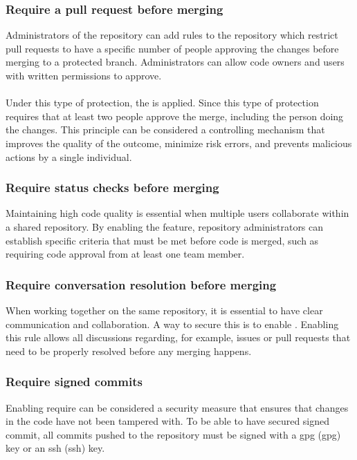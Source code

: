 \subsubsection{Require a pull request before merging}
Administrators of the repository can add rules to the repository which restrict pull requests to have a specific number of people approving the changes before merging to a protected branch. Administrators can allow code owners and users with written permissions to approve.
\\~\\
Under this type of protection, the  is applied. Since this type of protection requires that at least two people approve the merge, including the person doing the changes. This principle can be considered a controlling mechanism that improves the quality of the outcome, minimize risk errors, and prevents malicious actions by a single individual. 

\subsubsection{Require status checks before merging}
Maintaining high code quality is essential when multiple users collaborate within a shared repository. By enabling the  feature, repository administrators can establish specific criteria that must be met before code is merged, such as requiring code approval from at least one team member.

\subsubsection{Require conversation resolution before merging}
When working together on the same repository, it is essential to have clear communication and collaboration. A way to secure this is to enable . Enabling this rule allows all discussions regarding, for example, issues or pull requests that need to be properly resolved before any merging happens. 

\subsubsection{Require signed commits}
Enabling require  can be considered a security measure that ensures that changes in the code have not been tampered with. To be able to have secured signed commit, all commits pushed to the repository must be signed with a \acrlong{gpg} (\acrshort{gpg}) key or an \acrlong{ssh} (\acrshort{ssh}) key. 


